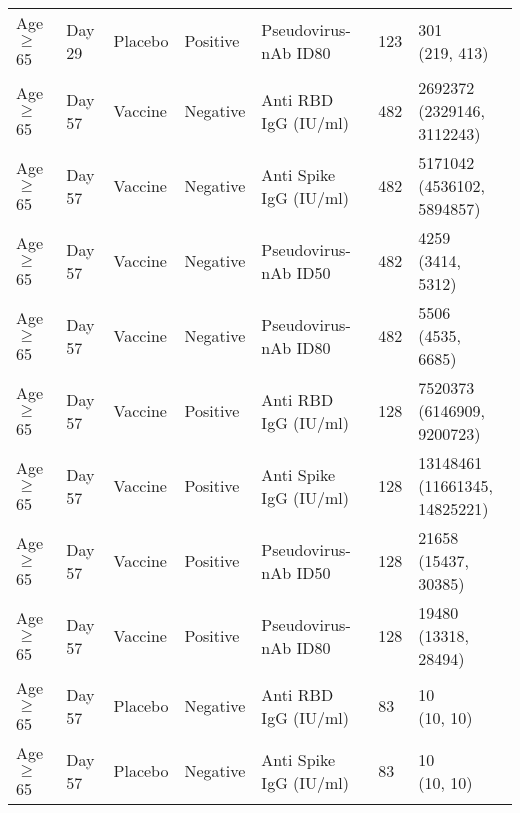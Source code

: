 \documentclass[]{book}
\theoremstyle{definition}
\theoremstyle{definition}
\theoremstyle{definition}
\newcommand{\1}{\mathbbm{1}}
\begin{document}
\begin{landscape}
\begin{ThreePartTable}
\begin{longtable}[t]{>{\raggedright\arraybackslash}p{7cm}llllll}
\hspace{1em}Age $\geq$ 65 & Day 29 & Placebo & Positive & Pseudovirus-nAb ID80 & 123 & \makecell[l]{301\\(219, 413)}\\
\hspace{1em}Age $\geq$ 65 & Day 57 & Vaccine & Negative & Anti RBD IgG (IU/ml) & 482 & \makecell[l]{2692372\\(2329146, 3112243)}\\
\hspace{1em}Age $\geq$ 65 & Day 57 & Vaccine & Negative & Anti Spike IgG (IU/ml) & 482 & \makecell[l]{5171042\\(4536102, 5894857)}\\
\hspace{1em}Age $\geq$ 65 & Day 57 & Vaccine & Negative & Pseudovirus-nAb ID50 & 482 & \makecell[l]{4259\\(3414, 5312)}\\
\hspace{1em}Age $\geq$ 65 & Day 57 & Vaccine & Negative & Pseudovirus-nAb ID80 & 482 & \makecell[l]{5506\\(4535, 6685)}\\
\hspace{1em}Age $\geq$ 65 & Day 57 & Vaccine & Positive & Anti RBD IgG (IU/ml) & 128 & \makecell[l]{7520373\\(6146909, 9200723)}\\
\hspace{1em}Age $\geq$ 65 & Day 57 & Vaccine & Positive & Anti Spike IgG (IU/ml) & 128 & \makecell[l]{13148461\\(11661345, 14825221)}\\
\hspace{1em}Age $\geq$ 65 & Day 57 & Vaccine & Positive & Pseudovirus-nAb ID50 & 128 & \makecell[l]{21658\\(15437, 30385)}\\
\hspace{1em}Age $\geq$ 65 & Day 57 & Vaccine & Positive & Pseudovirus-nAb ID80 & 128 & \makecell[l]{19480\\(13318, 28494)}\\
\hspace{1em}Age $\geq$ 65 & Day 57 & Placebo & Negative & Anti RBD IgG (IU/ml) & 83 & \makecell[l]{10\\(10, 10)}\\
\hspace{1em}Age $\geq$ 65 & Day 57 & Placebo & Negative & Anti Spike IgG (IU/ml) & 83 & \makecell[l]{10\\(10, 10)}\\

\end{longtable}
\end{ThreePartTable}
\end{landscape}
\end{document}
